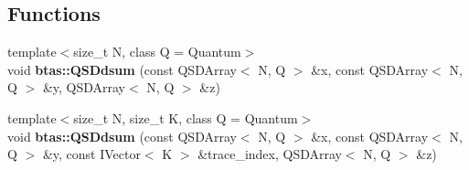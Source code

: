 \subsection*{Functions}
\begin{DoxyCompactItemize}
\item 
{\footnotesize template$<$size\-\_\-t N, class Q  = Quantum$>$ }\\void {\bf btas\-::\-Q\-S\-Ddsum} (const Q\-S\-D\-Array$<$ N, Q $>$ \&x, const Q\-S\-D\-Array$<$ N, Q $>$ \&y, Q\-S\-D\-Array$<$ N, Q $>$ \&z)
\item 
{\footnotesize template$<$size\-\_\-t N, size\-\_\-t K, class Q  = Quantum$>$ }\\void {\bf btas\-::\-Q\-S\-Ddsum} (const Q\-S\-D\-Array$<$ N, Q $>$ \&x, const Q\-S\-D\-Array$<$ N, Q $>$ \&y, const I\-Vector$<$ K $>$ \&trace\-\_\-index, Q\-S\-D\-Array$<$ N, Q $>$ \&z)
\end{DoxyCompactItemize}
